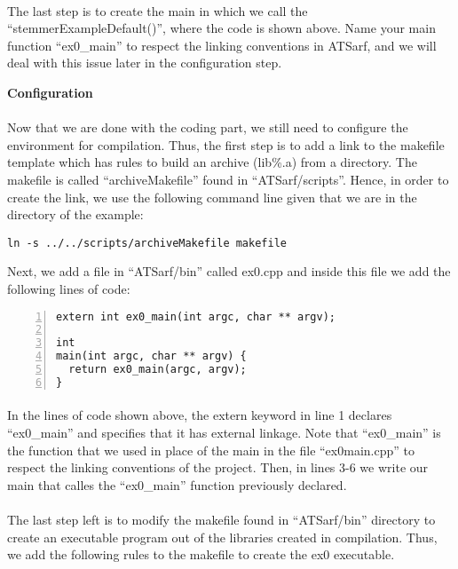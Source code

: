 \documentclass{article}
\begin{document}
\paragraph{}
The last step is to create the main in which we call the ``stemmerExampleDefault()'', where the code is shown above. Name your main function ``ex0\_main'' to respect the linking conventions in ATSarf, and we will deal with this issue later in the configuration step.

\begin{center}
\textbf{Configuration}
\end{center}

\paragraph{}
Now that we are done with the coding part, we still need to configure the environment for compilation. Thus, the first step is to add a link to the makefile template which has rules to build an archive (lib\%.a) from a directory. The makefile is called ``archiveMakefile'' found  in ``ATSarf/scripts''. Hence, in order to create the link, we use the following command line given that we are in the directory of the example:

\begin{Verbatim}
ln -s ../../scripts/archiveMakefile makefile
\end{Verbatim}

Next, we add a file in ``ATSarf/bin'' called ex0.cpp and inside this file we add the following lines of code:
\begin{Verbatim}[numbers=left]
extern int ex0_main(int argc, char ** argv);

int
main(int argc, char ** argv) {
  return ex0_main(argc, argv);
}
\end{Verbatim}

\paragraph{}
In the lines of code shown above, the extern keyword in line 1 declares ``ex0\_main'' and specifies that it has external linkage. Note that ``ex0\_main'' is the function that we used in place of the main in the file ``ex0main.cpp'' to respect the linking conventions of the project. Then, in lines 3-6 we write our main that calles the ``ex0\_main'' function previously declared.

\paragraph{}
The last step left is to modify the makefile found in ``ATSarf/bin'' directory to create an executable program out of the libraries created in compilation. Thus, we add the following rules to the makefile to create the ex0 executable.
\end{document}
